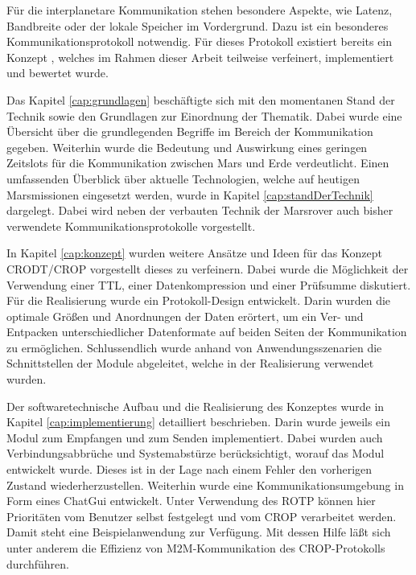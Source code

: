 
Für die interplanetare Kommunikation stehen besondere Aspekte, wie Latenz,
Bandbreite oder der lokale Speicher im Vordergrund. Dazu ist ein besonderes
Kommunikationsprotokoll notwendig. Für dieses Protokoll existiert
bereits ein Konzept \cite{Daher}, welches im Rahmen dieser Arbeit
teilweise verfeinert, implementiert und bewertet wurde.

Das Kapitel \ref{cap:grundlagen} beschäftigte sich
mit den momentanen Stand der Technik sowie den Grundlagen zur Einordnung der
Thematik. Dabei wurde eine Übersicht über die grundlegenden Begriffe im
Bereich der Kommunikation gegeben. Weiterhin wurde die Bedeutung und
Auswirkung eines geringen Zeitslots für die Kommunikation zwischen Mars und Erde
verdeutlicht.\newline
Einen umfassenden Überblick über aktuelle Technologien, welche auf heutigen
Marsmissionen eingesetzt werden, wurde in Kapitel \ref{cap:standDerTechnik}
dargelegt.
Dabei wird neben der verbauten Technik der Marsrover auch bisher verwendete
Kommunikationsprotokolle vorgestellt.

In Kapitel \ref{cap:konzept} wurden weitere Ansätze und Ideen für das Konzept
\gls{CRODT}/\gls{CROP} vorgestellt dieses zu verfeinern. Dabei wurde die
Möglichkeit der Verwendung einer \gls{TTL}, einer Datenkompression und einer
Prüfsumme diskutiert. Für die Realisierung wurde ein Protokoll-Design
entwickelt. Darin wurden die optimale Größen und Anordnungen der Daten erörtert,
um ein Ver- und Entpacken unterschiedlicher Datenformate auf beiden Seiten der
Kommunikation zu ermöglichen.
Schlussendlich wurde anhand von Anwendungsszenarien die Schnittstellen der
Module abgeleitet, welche in der Realisierung verwendet wurden.

Der softwaretechnische Aufbau und die Realisierung des Konzeptes
wurde in Kapitel \ref{cap:implementierung} detailliert beschrieben. Darin wurde
jeweils ein Modul zum Empfangen und zum Senden implementiert.
Dabei wurden auch Verbindungsabbrüche und Systemabstürze berücksichtigt, worauf
das Modul  entwickelt wurde. Dieses ist in der Lage nach
einem Fehler den vorherigen Zustand wiederherzustellen.
Weiterhin wurde eine Kommunikationsumgebung in Form eines ChatGui entwickelt.
Unter Verwendung des \gls{ROTP} können hier Prioritäten vom Benutzer selbst
festgelegt und vom \gls{CROP} verarbeitet werden. Damit steht eine
Beispielanwendung zur Verfügung. Mit dessen Hilfe läßt sich unter anderem
die Effizienz von M$2$M-Kommunikation des \gls{CROP}-Protokolls durchführen.

